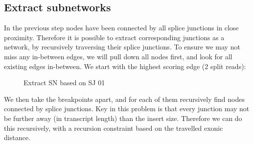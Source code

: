 \documentclass{article}
\theoremstyle{definition}
\begin{document}
\subsection{Extract subnetworks}
In the previous step nodes have been connected by all splice junctions in close proximity.
Therefore it is possible to extract corresponding junctions as a network, by recursively traversing their splice junctions.
To ensure we may not miss any in-between edges, we will pull down all nodes first, and look for all existing edges in-between.
We start with the highest scoring edge (2 split reads):

\begin{figure}
\begin{center}
\end{center}
\caption{Extract SN based on SJ 01}
\label{fig:extract_sn_01}
\end{figure}
\noindent We then take the breakpoints apart, and for each of them recursively find nodes connected by splice junctions.
Key in this problem is that every junction may not be further away (in transcript length) than the insert size.
Therefore we can do this recursively, with a recursion constraint based on the travelled exonic distance.
\end{document}
